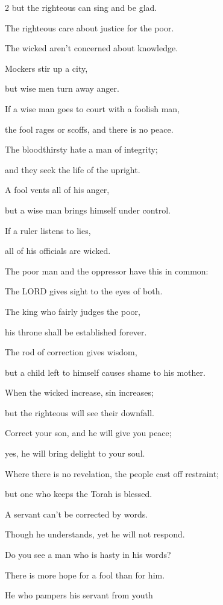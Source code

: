 \begin{multicols}{2}
but the righteous can sing and be glad.


\myverse{}The righteous care about justice for the poor.

The wicked aren’t concerned about knowledge.


\myverse{}Mockers stir up a city,

but wise men turn away anger.


\myverse{}If a wise man goes to court with a foolish man,

the fool rages or scoffs, and there is no peace.


\myverse{}The bloodthirsty hate a man of integrity;

and they seek the life of the upright.


\myverse{}A fool vents all of his anger,

but a wise man brings himself under control.


\myverse{}If a ruler listens to lies,

all of his officials are wicked.


\myverse{}The poor man and the oppressor have this in common:

The LORD gives sight to the eyes of both.


\myverse{}The king who fairly judges the poor,

his throne shall be established forever.


\myverse{}The rod of correction gives wisdom,

but a child left to himself causes shame to his mother.


\myverse{}When the wicked increase, sin increases;

but the righteous will see their downfall.


\myverse{}Correct your son, and he will give you peace;

yes, he will bring delight to your soul.


\myverse{}Where there is no revelation, the people cast off restraint;

but one who keeps the Torah is blessed.


\myverse{}A servant can’t be corrected by words.

Though he understands, yet he will not respond.


\myverse{}Do you see a man who is hasty in his words?

There is more hope for a fool than for him.


\myverse{}He who pampers his servant from youth


\end{multicols}
